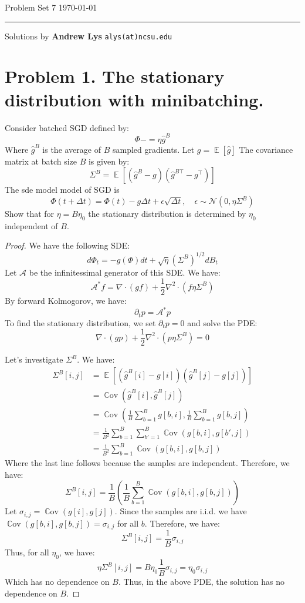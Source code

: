 \documentclass{amsart}
\newcommand{\cA}{\mathcal{A}}
\newcommand{\cN}{\mathcal{N}}
\newcommand{\Cov}[1]{\operatorname{\mathbb{C}ov}\left(#1\right)}
\newcommand{\ee}[1]{\operatorname{\mathbb{E}}\left[#1\right]}
\theoremstyle{definition}
\begin{document}
\noindent
Problem Set 7  \hfill \today  %
\smallskip
\hrule
\smallskip
\noindent
Solutions by {\bf Andrew Lys} \qquad   %
  {\tt alys(at)ncsu.edu}

\vspace{0.5cm}

\section*{Problem 1. The stationary distribution with minibatching.}
Consider batched SGD defined by:
\[
\Phi -= \eta \hat{g}^B
\]
Where $\hat{g}^B$ is the average of $B$ sampled gradients. 
Let $g = \ee{\hat{g}}$
The covariance matrix at batch size $B$ is given by:
\[
\Sigma^B = \ee{(\hat{g}^B - g)(\hat{g}^{B\top} - g^\top)}
\]
The sde model model of SGD is 
\[
\Phi(t + \Delta t) = \Phi(t) - g\Delta t + \epsilon \sqrt{\Delta t}, \quad \epsilon \sim \cN(0, \eta \Sigma^B)
\]
Show that for $\eta = B \eta_0$ the stationary distribution is determined by $\eta_0$ independent of $B$. 
\begin{proof}
We have the following SDE:
\[
d \Phi_t = - g(\Phi) d t + \sqrt{\eta} (\Sigma^B)^{1/2} d B_t
\]
Let $\cA$ be the infinitessimal generator of this SDE. 
We have:
\[
\cA^\ast f =  \nabla \cdot (g f) + \frac12 \nabla^2 \cdot (f \eta\Sigma^B)
\]
By forward Kolmogorov, we have:
\[
\partial_t p = \cA^\ast p 
\]
To find the stationary distribution, we set $\partial_t p = 0$ and solve the PDE:
\[
\nabla \cdot (g p) + \frac12 \nabla^2 \cdot (p \eta\Sigma^B) = 0
\]

Let's investigate $\Sigma^B$. We have:
\begin{align*}
  \Sigma^B[i,j] &= \ee{(\hat{g}^B[i] - g[i])(\hat{g}^B[j] - g[j])} \\
  &= \Cov{\hat{g}^B[i], \hat{g}^B[j]} \\
  &= \Cov{\frac{1}{B} \sum_{b = 1}^B g[b, i], \frac{1}{B} \sum_{b = 1}^B g[b, j]} \\
  &= \frac{1}{B^2} \sum_{b = 1}^B \sum_{b' = 1}^B \Cov{g[b, i], g[b', j]} \\
  &= \frac{1}{B^2} \sum_{b = 1}^B \Cov{g[b, i], g[b, j]} 
\end{align*}
Where the last line follows because the samples are independent.
Therefore, we have:
\[
\Sigma^B[i,j] = \frac1{B} \left(\frac1{B}\sum_{b = 1}^B \Cov{g[b,i], g[b,j]}\right)
\]
Let $\sigma_{i,j} = \Cov{g[i], g[j]}$. Since the samples are i.i.d. we have $\Cov{g[b,i], g[b,j]} = \sigma_{i,j}$ for all $b$. Therefore, we have:
\[
\Sigma^B[i,j] = \frac1{B} \sigma_{i,j}
\]
Thus, for all $\eta_0$, we have:
\[
\eta \Sigma^B[i,j] = B \eta_0 \frac1{B} \sigma_{i,j} = \eta_0 \sigma_{i,j}
\]
Which has no dependence on $B$. Thus, in the above PDE, the solution has no dependence on $B$.
\end{proof}
\end{document}
